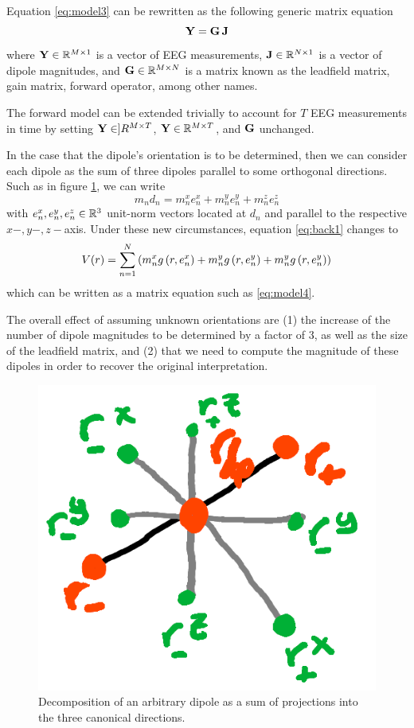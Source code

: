Equation \eqref{eq:model3} can be rewritten as the following generic matrix equation
\begin{equation}
\mathbf{Y} = \mathbf{G}\, \mathbf{J}
\label{eq:model4}
\end{equation}
where $\mathbf{Y} \in \mathbb{R}^{M\times 1}$ is a vector of EEG measurements, $\mathbf{J} \in \mathbb{R}^{N\times 1}$ is a vector of dipole magnitudes, and $\mathbf{G} \in \mathbb{R}^{M\times N}$ is a matrix known as the leadfield matrix, gain matrix, forward operator, among other names.

The forward model can be extended trivially to account for $T$ EEG measurements in time by setting $\mathbf{Y} \in ]R^{M\times T}$, $\mathbf{Y} \in \mathbb{R}^{M\times T}$, and $\mathbf{G}$ unchanged.


In the case that the dipole's orientation is to be determined, then we can consider each dipole as the sum of three dipoles parallel to some orthogonal directions. Such as in figure \ref{fig:diagrams3}, we can write
\begin{equation}
m_n d_n = m_n^x e_n^x + m_n^y e_n^y + m_n^z e_n^z
\end{equation}
with $e_n^x, e_n^y, e_n^z \in \mathbb{R}^3$ unit-norm vectors located at $d_n$ and parallel to the respective $x-, y-, z-$axis.
%
Under these new circumstances, equation \eqref{eq:back1} changes to
\begin{equation}
V(r) = 
\sum_{n=1}^N \left( m_n^x g\left( r, e_n^x \right) + m_n^y g\left( r, e_n^y \right) + m_n^y g\left( r, e_n^y \right)
 \right)
\end{equation}
which can be written as a matrix equation such as \eqref{eq:model4}.

The overall effect of assuming unknown orientations are (1) the increase of the number of dipole magnitudes to be determined by a factor of 3, as well as the size of the leadfield matrix, and (2)
that we need to compute the magnitude of these dipoles in order to recover the original interpretation.

\begin{figure}
\centering
\includegraphics[width=0.4\linewidth]{./img_dev/nsOrthDecomp}
\caption{Decomposition of an arbitrary dipole as a sum of projections into the three canonical directions.}
\label{fig:diagrams3}
\end{figure}